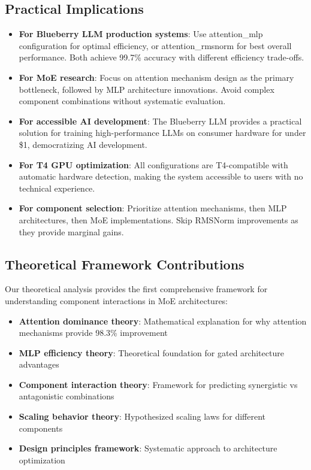 \documentclass[11pt,a4paper]{article}
\begin{document}
\subsection{Practical Implications}

\begin{itemize}
    \item \textbf{For Blueberry LLM production systems}: Use attention\_mlp configuration for optimal efficiency, or attention\_rmsnorm for best overall performance. Both achieve 99.7\% accuracy with different efficiency trade-offs.
    \item \textbf{For MoE research}: Focus on attention mechanism design as the primary bottleneck, followed by MLP architecture innovations. Avoid complex component combinations without systematic evaluation.
    \item \textbf{For accessible AI development}: The Blueberry LLM provides a practical solution for training high-performance LLMs on consumer hardware for under \$1, democratizing AI development.
    \item \textbf{For T4 GPU optimization}: All configurations are T4-compatible with automatic hardware detection, making the system accessible to users with no technical experience.
    \item \textbf{For component selection}: Prioritize attention mechanisms, then MLP architectures, then MoE implementations. Skip RMSNorm improvements as they provide marginal gains.
\end{itemize}

\subsection{Theoretical Framework Contributions}

Our theoretical analysis provides the first comprehensive framework for understanding component interactions in MoE architectures:

\begin{itemize}
    \item \textbf{Attention dominance theory}: Mathematical explanation for why attention mechanisms provide 98.3\% improvement
    \item \textbf{MLP efficiency theory}: Theoretical foundation for gated architecture advantages
    \item \textbf{Component interaction theory}: Framework for predicting synergistic vs antagonistic combinations
    \item \textbf{Scaling behavior theory}: Hypothesized scaling laws for different components
    \item \textbf{Design principles framework}: Systematic approach to architecture optimization
\end{itemize}
\end{document}
